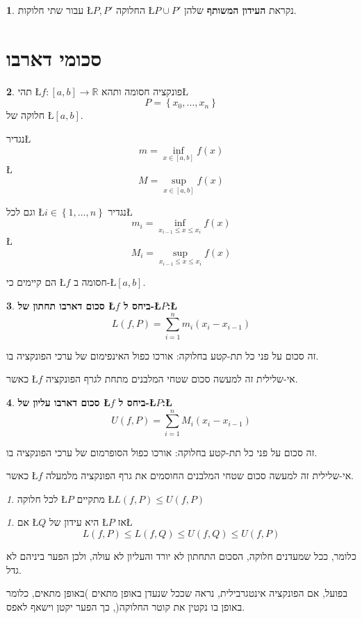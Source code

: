 \documentclass[english,hebrew]{article}
\theoremstyle{remark}
\theoremstyle{definition}
\newtheorem*{defn*}{\protect\definitionname}
\theoremstyle{plain}
\theoremstyle{remark}
\newtheorem{claim}[thm]{\protect\claimname}
\theoremstyle{plain}
\theoremstyle{plain}
\theoremstyle{definition}
\theoremstyle{plain}
\providecommand{\claimname}{טענה}
\providecommand{\definitionname}{הגדרה}
\begin{document}
\begin{defn*}
עבור שתי חלוקות \L{$P,P'$} החלוקה \L{$P\cup P'$} נקראת \textbf{העידון
המשותף} שלהן.
\end{defn*}

\section{סכומי דארבו}
\begin{defn*}
תהי \L{$f:\left[a,b\right]\rightarrow\mathbb{R}$} פונקציה חסומה ותהא\L{%
\[
P=\left\{ x_{0},\dots,x_{n}\right\} 
\]
}%
 חלוקה של \L{$\left[a,b\right]$}.

נגדיר\L{%
\[
m=\underset{x\in\left[a,b\right]}{\inf}f(x)
\]
}%
\L{%
\[
M=\underset{x\in\left[a,b\right]}{\sup}f(x)
\]
}%

וגם לכל \L{$i\in\left\{ 1,\dots,n\right\} $} נגדיר\L{%
\[
m_{i}=\underset{x_{i-1}\le x\le x_{i}}{\inf}f(x)
\]
}%
\L{%
\[
M_{i}=\underset{x_{i-1}\le x\le x_{i}}{\sup}f(x)
\]
}%

הם קיימים כי \L{$f$} חסומה ב-\L{$\left[a,b\right]$}.
\end{defn*}
\begin{defn*}
\textbf{סכום דארבו תחתון של \L{$f$} ביחס ל-\L{$P$}:\L{%
\[
L\left(f,P\right)=\underset{i=1}{\overset{n}{\sum}}m_{i}\left(x_{i}-x_{i-1}\right)
\]
}%
}

זה סכום על פני כל תת-קטע בחלוקה: אורכו כפול האינפימום של ערכי הפונקציה
בו.

כאשר \L{$f$} אי-שלילית זה למעשה סכום שטחי המלבנים מתחת לגרף הפונקציה.
\end{defn*}
\begin{defn*}
\textbf{סכום דארבו עליון של \L{$f$} ביחס ל-\L{$P$}:\L{%
\[
U\left(f,P\right)=\underset{i=1}{\overset{n}{\sum}}M_{i}\left(x_{i}-x_{i-1}\right)
\]
}%
}

זה סכום על פני כל תת-קטע בחלוקה: אורכו כפול הסופרמום של ערכי הפונקציה
בו.

כאשר \L{$f$} אי-שלילית זה למעשה סכום שטחי המלבנים החוסמים את גרף
הפונקציה מלמעלה.
\end{defn*}
\begin{claim}
לכל חלוקה \L{$P$} מתקיים \L{$L\left(f,P\right)\le U\left(f,P\right)$}
\end{claim}

\begin{claim}
אם \L{$Q$} היא עידון של \L{$P$} אז\L{%
\[
L\left(f,P\right)\le L\left(f,Q\right)\le U\left(f,Q\right)\le U\left(f,P\right)
\]
}%

כלומר, ככל שמעדנים חלוקה, הסכום התחתון לא יורד והעליון לא עולה, ולכן
הפער ביניהם לא גדל. 

בפועל, אם הפונקציה אינטגרבילית, נראה שככל שנעדן באופן מתאים )באופן
מתאים, כלומר באופן בו נקטין את קוטר החלוקה(, כך הפער יקטן וישאף לאפס.
\end{claim}
\end{document}
